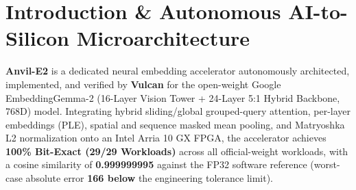 \documentclass[11pt,a4paper]{article}
\begin{document}
\section{Introduction \& Autonomous AI-to-Silicon Microarchitecture}

\textbf{Anvil-E2} is a dedicated neural embedding accelerator autonomously architected, implemented, and verified by \textbf{Vulcan} for the open-weight Google EmbeddingGemma-2 (\allowbreak{}16-Layer Vision Tower +\allowbreak{} 24-Layer 5:1 Hybrid Backbone,\allowbreak{} 768D)\allowbreak{} model. Integrating hybrid sliding/global grouped-query attention, per-layer embeddings (PLE), spatial and sequence masked mean pooling, and Matryoshka L2 normalization onto an Intel Arria 10 GX FPGA, the accelerator achieves \textbf{100\% Bit-Exact (\allowbreak{}29/\allowbreak{}29 Workloads)\allowbreak{}} across all official-weight workloads, with a cosine similarity of \textbf{0.999999995} against the FP32 software reference (worst-case absolute error \textbf{166\texttimes{} below} the engineering tolerance limit).

\vspace{2pt}
\end{document}
